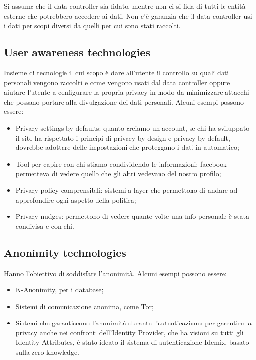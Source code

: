 \noindent Si assume che il data controller sia fidato, mentre non ci si fida di tutti le entità esterne che potrebbero accedere ai dati. Non c'è garanzia che il data controller usi i dati per scopi diversi da quelli per cui sono stati raccolti.

\subsection{User awareness technologies}
Insieme di tecnologie il cui scopo è dare all'utente il controllo su quali dati personali vengono raccolti e come vengono usati dal data controller oppure aiutare l'utente a configurare la propria privacy in modo da minimizzare attacchi che possano portare alla divulgazione dei dati personali. Alcuni esempi possono essere:

\begin{itemize}
    \item Privacy settings by defaults: quanto creiamo un account, se chi ha sviluppato il sito ha rispettato i principi di privacy by design e privacy by default, dovrebbe adottare delle impostazioni che proteggano i dati in automatico;
    \item Tool per capire con chi stiamo condividendo le informazioni: facebook permetteva di vedere quello che gli altri vedevano del nostro profilo;
    \item Privacy policy comprensibili: sistemi a layer che permettono di andare ad approfondire ogni aspetto della politica;
    \item Privacy nudges: permettono di vedere quante volte una info personale è stata condivisa e con chi.
\end{itemize}

\subsection{Anonimity technologies}
Hanno l'obiettivo di soddisfare l'anonimità. Alcuni esempi possono essere:
\begin{itemize}
    \item K-Anonimity, per i database;
    \item Sistemi di comunicazione anonima, come Tor;
    \item Sistemi che garantiscono l'anonimità durante l'autenticazione: per garentire la privacy anche nei confronti dell'Identity Provider, che ha visioni su tutti gli Identity Attributes, è stato ideato il sistema di autenticazione Idemix, basato sulla zero-knowledge.
\end{itemize}

